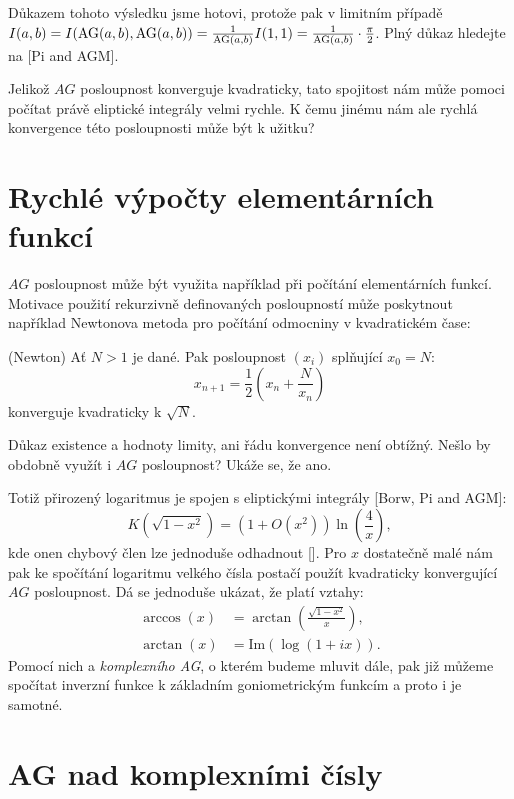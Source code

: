 \documentclass[12pt]{report}
\begin{document}
\begin{center}
\begin{verse}
\textit{}
\end{verse}
\end{center}
Důkazem tohoto výsledku jsme hotovi, protože pak v limitním případě $I(a,b) = I(\operatorname{AG}(a,b),\operatorname{AG}(a,b)) = \frac{1}{\operatorname{AG}(a,b)} I(1,1) = \frac{1}{\operatorname{AG}(a,b)} \cdot \frac{\pi}{2}$. Plný důkaz hledejte na [Pi and AGM]. 

Jelikož $AG$ posloupnost konverguje kvadraticky, tato spojitost nám může pomoci počítat právě eliptické integrály velmi rychle. K čemu jinému nám ale rychlá konvergence této posloupnosti může být k užitku?
\section{Rychlé výpočty elementárních funkcí}

$AG$ posloupnost může být využita například při počítání elementárních funkcí. Motivace použití rekurzivně definovaných posloupností může poskytnout například Newtonova metoda pro počítání odmocniny v kvadratickém čase:

\begin{veta}(Newton)
Ať $N>1$ je dané. Pak posloupnost $(x_i)$ splňující $x_0 = N$:
$$x_{n+1} = \frac{1}{2} \left( x_n + \frac{N}{x_n}\right)$$
konverguje kvadraticky k $\sqrt{N}$.
\end{veta}
Důkaz existence a hodnoty limity, ani řádu konvergence není obtížný. Nešlo by obdobně využít i $AG$ posloupnost? Ukáže se, že ano.

Totiž přirozený logaritmus je  spojen s eliptickými integrály [Borw, Pi and AGM]:
$$K(\sqrt{1-x^2}) = \left(1+O(x^2)\right)\ln\left(\frac{4}{x} \right),$$
kde onen chybový člen lze jednoduše odhadnout []. Pro $x$ dostatečně malé nám pak ke spočítání logaritmu velkého čísla postačí použít kvadraticky konvergující $AG$ posloupnost. Dá se jednoduše ukázat, že platí vztahy:
\begin{align*}
\arccos (x) &= \arctan\left(\frac{\sqrt{1-x^2}}{x} \right),\\
\arctan (x) &= \textrm{Im}(\log(1+ix)).
\end{align*}
Pomocí nich a \textit{komplexního AG}, o kterém budeme mluvit dále, pak již můžeme spočítat inverzní funkce k základním goniometrickým funkcím a proto i je samotné.

\section{AG nad komplexními čísly}
\end{document}
